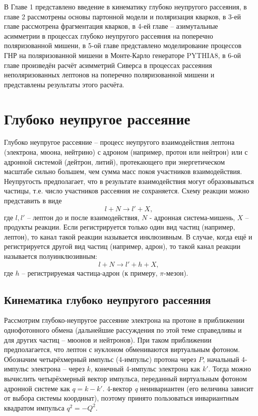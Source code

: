 \documentclass{extarticle}
\begin{document}
В Главе 1 представлено введение в кинематику глубоко неупругого рассеяния, в главе 2 рассмотрены основы партонной модели и поляризация кварков, в 3-ей главе рассмотрена фрагментация кварков,  в 4-ей главе -- азимутальные асимметрии в процессах глубоко неупругого рассеяния на поперечно поляризованной мишени, в 5-ой главе представлено моделирование процессов ГНР на поляризованной мишени в Монте-Карло генераторе PYTHIA8, в 6-ой главе произведён расчёт асимметрий Сиверса в процессах рассеяния неполяризованных лептонов на поперечно поляризованной мишени и представлены результаты этого расчёта.

\newpage
\section{Глубоко неупругое рассеяние}
Глубоко неупругое рассеяние – процесс неупругого взаимодействия лептона (электрона, мюона, нейтрино) с адроном (например, протон или нейтрон) или с адронной системой (дейтрон, литий), протекающего при энергетическом масштабе сильно большем, чем сумма масс покоя участников взаимодействия. Неупругость предполагает, что в результате взаимодействия могут образовываться частицы, т.е. число участников рассеяния не сохраняется. Схему реакции можно представить в виде
\begin{equation}
	l + N \rightarrow l' + X,
\end{equation}
где $l, l'$ -- лептон до и после взаимодействия, $N$ - адронная система-мишень, $X$ -- продукты реакции. Если регистрируется только один вид частиц (например, лептон), то канал такой реакции называется инклюзивным. В случае, когда ещё и регистрируется другой вид частиц (например, адрон), то такой канал реакции называется полуинклюзивным:
\begin{equation}
	l + N \rightarrow l' + h + X,
\end{equation}
где $h$ -- регистрируемая частица-адрон (к примеру, $\pi$-мезон). 
\subsection{Кинематика глубоко неупругого рассеяния}
Рассмотрим глубоко-неупругое рассеяние электрона на протоне в приближении однофотонного обмена (дальнейшие рассуждения по этой теме справедливы и для других частиц – мюонов и нейтронов). При таком приближении предполагается, что лептон с нуклоном обмениваются виртуальным фотоном. Обозначим четырёхмерный импульс (4-импульс) протона через $P$, начальный 4-импульс электрона – через $k$,  конечный 4-импульс электрона как $k'$. Тогда можно вычислить четырёхмерный вектор импульса, переданный виртуальным фотоном адронной системе как $q=k-k'$. 4-вектор \textit{q} неинвариантен (его величина зависит от выбора системы координат), поэтому принято пользоваться инвариантным квадратом импульса $q^2=-Q^2$.
\end{document}
